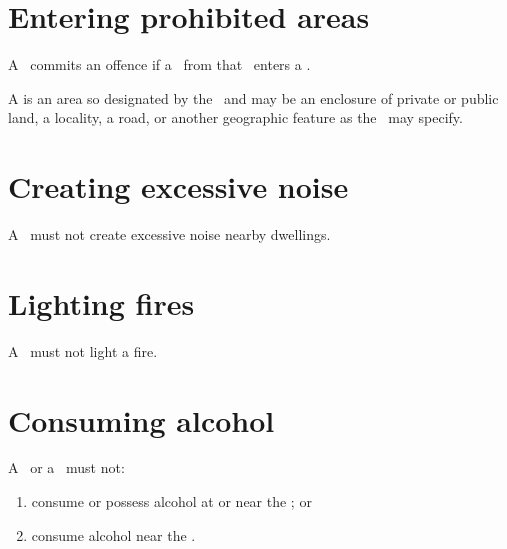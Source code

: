 \documentclass[12pt]{report}
\begin{document}
  \section{Entering prohibited areas}
  \begin{fenumerate}
    \item A \team\ commits an offence if
       a \competitor\ from that \team\ enters a \prohibitedarea.

    \item A  is an area so designated by the \RaceDirector\ and may be an enclosure of private or public land, a locality, a road, or another geographic feature as the \RaceDirector\ may specify.

  \end{fenumerate}
  \section{Creating excessive noise}
  \begin{fenumerate}
    \item A \team\ must not create excessive noise nearby dwellings.

  \end{fenumerate}
  \section{Lighting fires}
  \begin{fenumerate}
    \item A \team\ must not light a fire.

  \end{fenumerate}
  \section{Consuming alcohol}
  \begin{fenumerate}
    \item A \spectator\ or a \competitor\ must not:%
    \begin{enumerate}
    \item consume or possess alcohol at or near the \Endpoint; or
    \item consume alcohol near the \scrutineeringarea.
    \end{enumerate}

  \end{fenumerate}
\end{document}
